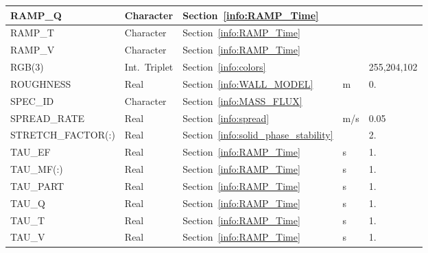 \documentclass[11pt]{book}
\begin{document}
\begin{longtable}{@{\extracolsep{\fill}}|l|l|l|l|l|}
{\ct RAMP\_Q}                         & Character       & Section~\ref{info:RAMP_Time}              &                     &                         \\ \hline
{\ct RAMP\_T}                         & Character       & Section~\ref{info:RAMP_Time}              &                     &                         \\ \hline
{\ct RAMP\_V}                         & Character       & Section~\ref{info:RAMP_Time}              &                     &                         \\ \hline
{\ct RGB(3)}                          & Int.~Triplet    & Section~\ref{info:colors}                 &                     & \small 255,204,102      \\ \hline
{\ct ROUGHNESS}                       & Real            & Section~\ref{info:WALL_MODEL}             & m                   & 0.                      \\ \hline
{\ct SPEC\_ID}                        & Character       & Section~\ref{info:MASS_FLUX}              &                     &                         \\ \hline
{\ct SPREAD\_RATE}                    & Real            & Section~\ref{info:spread}                 & m/s                 & 0.05                    \\ \hline
{\ct STRETCH\_FACTOR(:) }             & Real            & Section~\ref{info:solid_phase_stability}  &                     & 2.                      \\ \hline
{\ct TAU\_EF}                         & Real            & Section~\ref{info:RAMP_Time}              & s                   & 1.                      \\ \hline
{\ct TAU\_MF(:)}                      & Real            & Section~\ref{info:RAMP_Time}              & s                   & 1.                      \\ \hline
{\ct TAU\_PART}                       & Real            & Section~\ref{info:RAMP_Time}              & s                   & 1.                      \\ \hline
{\ct TAU\_Q}                          & Real            & Section~\ref{info:RAMP_Time}              & s                   & 1.                      \\ \hline
{\ct TAU\_T}                          & Real            & Section~\ref{info:RAMP_Time}              & s                   & 1.                      \\ \hline
{\ct TAU\_V}                          & Real            & Section~\ref{info:RAMP_Time}              & s                   & 1.                      \\ \hline

\end{longtable}
\end{document}
